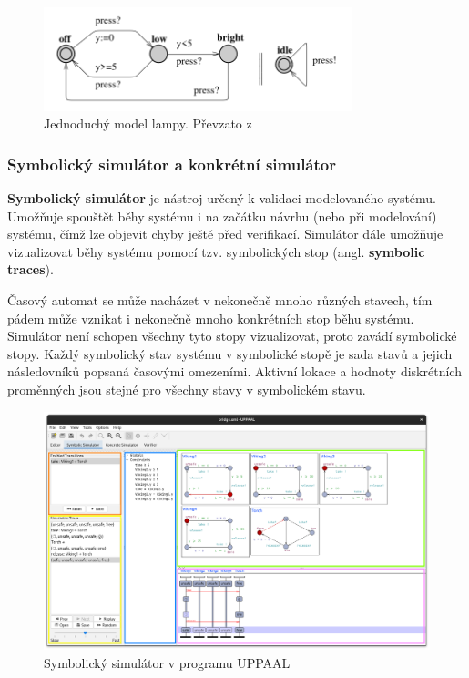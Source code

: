 \begin{figure}[H]
    \centering
    \includegraphics[width=0.8\textwidth]{obrazky-figures/lamp_model.png}
    \caption{Jednoduchý model lampy. Převzato z \cite{uppaal_intro}}
    \label{fig:lamp}
\end{figure}

\subsubsection{Symbolický simulátor a konkrétní simulátor}
\textbf{Symbolický simulátor} je nástroj určený k validaci modelovaného systému. Umožňuje spouštět běhy systému i na začátku návrhu (nebo při modelování) systému, čímž lze objevit chyby ještě před verifikací. Simulátor dále umožňuje vizualizovat běhy systému pomocí tzv. symbolických stop (angl. \textbf{symbolic traces}).

Časový automat se může nacházet v nekonečně mnoho různých stavech, tím pádem může vznikat i nekonečně mnoho konkrétních stop běhu systému. Simulátor není schopen všechny tyto stopy vizualizovat, proto zavádí symbolické stopy. Každý symbolický stav systému v symbolické stopě je sada stavů a jejich následovníků popsaná časovými omezeními. Aktivní lokace a hodnoty diskrétních proměnných jsou stejné pro všechny stavy v symbolickém stavu.

\begin{figure}[H]
    \centering
    \includegraphics[width=\textwidth]{obrazky-figures/uppaal_symbsim.png}
    \caption{Symbolický simulátor v programu UPPAAL}
    \label{fig:uppaal_symbsim}
\end{figure}

